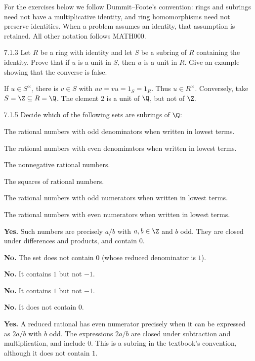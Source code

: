 \documentclass[11pt,oneside]{article}
\begin{document}

\begin{convention}
For the exercises below we follow Dummit--Foote's convention: rings and subrings need not have a multiplicative identity, and ring homomorphisms need not preserve identities. When a problem assumes an identity, that assumption is retained. All other notation follows MATH000.
\end{convention}

\begin{exercise}{7.1.3}
Let $R$ be a ring with identity and let $S$ be a subring of $R$ containing the identity. Prove that if $u$ is a unit in $S$, then $u$ is a unit in $R$. Give an example showing that the converse is false.
\end{exercise}
\begin{solution}
If $u\in S^\times$, there is $v\in S$ with $uv=vu=1_S=1_R$. Thus $u\in R^\times$. Conversely, take $S=\Z\subseteq R=\Q$. The element $2$ is a unit of $\Q$, but not of $\Z$.
\end{solution}

\begin{exercise}{7.1.5}
Decide which of the following sets are subrings of $\Q$:
\begin{exercisesubparts}
\item The rational numbers with odd denominators when written in lowest terms.
\item The rational numbers with even denominators when written in lowest terms.
\item The nonnegative rational numbers.
\item The squares of rational numbers.
\item The rational numbers with odd numerators when written in lowest terms.
\item The rational numbers with even numerators when written in lowest terms.
\end{exercisesubparts}
\end{exercise}
\begin{solution}
\begin{exercisesubparts}
\item \textbf{Yes.} Such numbers are precisely $a/b$ with $a,b\in\Z$ and $b$ odd. They are closed under differences and products, and contain $0$.
\item \textbf{No.} The set does not contain $0$ (whose reduced denominator is $1$).
\item \textbf{No.} It contains $1$ but not $-1$.
\item \textbf{No.} It contains $1$ but not $-1$.
\item \textbf{No.} It does not contain $0$.
\item \textbf{Yes.} A reduced rational has even numerator precisely when it can be expressed as $2a/b$ with $b$ odd. The expressions $2a/b$ are closed under subtraction and multiplication, and include $0$. This is a subring in the textbook's convention, although it does not contain $1$.
\end{exercisesubparts}
\end{solution}
\end{document}

